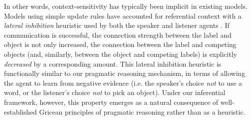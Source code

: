 %
In other words, context-sensitivity has typically been implicit in existing models. 
Models using simple update rules have accounted for referential context with a \emph{lateral inhibition} heuristic used by both the speaker and listener agents \cite{franke2012bidirectional,steels2005coordinating}.
If communication is successful, the connection strength between the label and object is not only increased, the connection between the label and competing objects (and, similarly, between the object and competing labels) is explicitly \emph{decreased} by a corresponding amount.
This lateral inhibition heuristic is functionally similar to our pragmatic reasoning mechanism, in terms of allowing the agent to learn from negative evidence (i.e. the speaker's choice \emph{not} to use a word, or the listener's choice \emph{not} to pick an object). 
Under our inferential framework, however, this property emerges as a natural consequence of well-established Gricean principles of pragmatic reasoning rather than as a heuristic.

